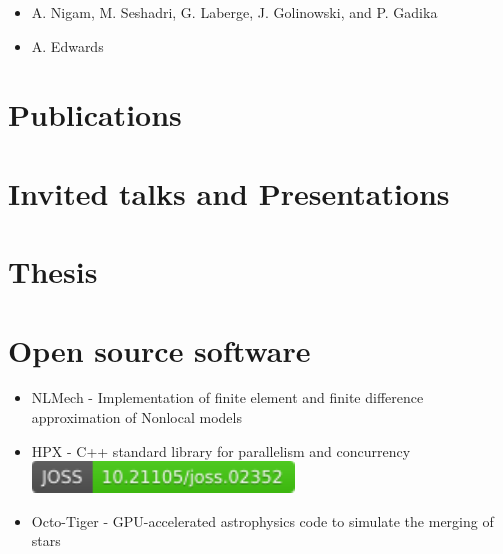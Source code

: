 \documentclass[11pt,a4paper,sans]{moderncv}
\begin{document}
\begin{itemize}[leftmargin=4cm]
\item A. Nigam, M. Seshadri, G. Laberge, J. Golinowski, and P. Gadika
\end{itemize}

\begin{itemize}[leftmargin=4cm]
\item A. Edwards
\end{itemize}

\section{Publications}



 

\section{Invited talks and Presentations}

\section{Thesis}
\section{Open source software}
\cvitem{}{}
\begin{itemize}[leftmargin=4cm]
\item NLMech - Implementation of finite element and finite difference approximation of Nonlocal models
\item HPX - C++ standard library for parallelism and concurrency \href{https://doi.org/10.21105/joss.02352}{\includegraphics[scale=0.5]{status-hpx.pdf}}
\item Octo-Tiger - GPU-accelerated astrophysics code to simulate the merging of stars
\end{itemize}
\end{document}

